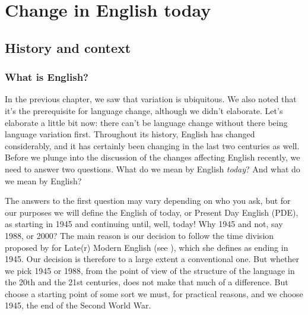 \chapter{Change in English today}\label{englishtoday}
\largerpage
\section{History and context}
\subsection{What is English?}\label{what}
In the previous chapter, we saw that variation is ubiquitous. We also noted that it's the prerequisite for language change, although we didn't elaborate. Let's elaborate a little bit now: there can't be language change without there being language variation first. Throughout its history, English has changed considerably, and it has certainly been changing in the last two centuries as well. Before we plunge into the discussion of the changes affecting English recently, we need to answer two questions. What do we mean by English \textit{today}? And what do we mean by English?

The answers to the first question may vary depending on who you ask, but for our purposes we will define the English of today, or Present Day English (PDE), as starting in 1945 and continuing until, well, today! Why 1945 and not, say 1988, or 2000? The main reason is our decision to follow the time division proposed by \citet{Beal2004} for Late(r) Modern English (see ), which she defines as ending in 1945. Our decision is therefore to a large extent a conventional one. But whether we pick 1945 or 1988, from the point of view of the structure of the language in the 20th and the 21st centuries, does not make that much of a difference. But choose a starting point of some sort we must, for practical reasons, and we choose 1945, the end of the Second World War.

